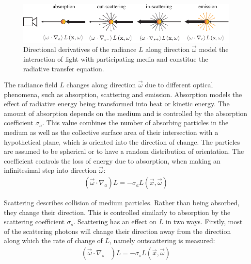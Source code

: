 \begin{figure}[h]
\centering
\includegraphics[width=1.0\textwidth]{03_foundations_of_light_transport_simulation/figures/fig_rte_terms.pdf}
\caption{Directional derivatives of the radiance $L$ along direction $\vec{\omega}$ model the interaction of light with participating media and constitue the radiative transfer equation.}
\label{fig:rte_change_L_all}
\end{figure}

The radiance field $L$ changes along direction $\vec{\omega}$ due to different optical phenomena, such as absorption, scattering and emission. Absorption models the effect of radiative energy being transformed into heat or kinetic energy. The amount of absorption depends on the medium and is controlled by the absorption coefficient $\sigma_a$. This value combines the number of absorbing particles in the medium as well as the collective surface area of their intersection with a hypothetical plane, which is oriented into the direction of change. The particles are assumed to be spherical or to have a random distribution of orientation. The coefficient controls the loss of energy due to absorption, when making an infinitesimal step into direction $\vec{\omega}$:
\begin{align}
\left(\vec{\omega}\cdot\nabla_{a}\right)L = -\sigma_a L\left(\vec{x}, \vec{\omega} \right)
\end{align}

Scattering describes collision of medium particles. Rather than being absorbed, they change their direction. This is controlled similarly to absorption by the scattering coefficient $\sigma_s$. Scattering has an effect on $L$ in two ways. Firstly, most of the scattering photons will change their direction away from the direction along which the rate of change of $L$, namely outscattering is measured:
\begin{align}
\left(\vec{\omega}\cdot\nabla_{s-}\right)L = -\sigma_s L\left(\vec{x}, \vec{\omega} \right)
\end{align}

